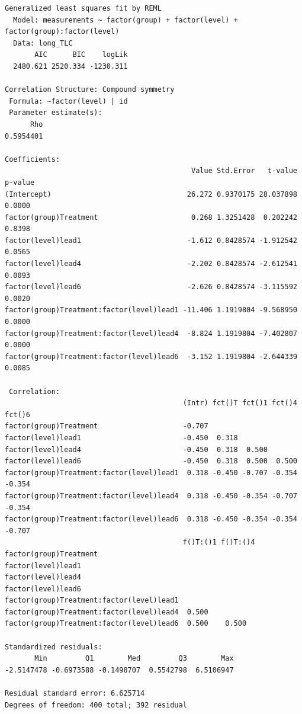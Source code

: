 \documentclass[
  letterpaper,
  DIV=11,
  numbers=noendperiod]{scrreprt}
\begin{document}
\begin{verbatim}
Generalized least squares fit by REML
  Model: measurements ~ factor(group) + factor(level) + factor(group):factor(level) 
  Data: long_TLC 
       AIC      BIC    logLik
  2480.621 2520.334 -1230.311

Correlation Structure: Compound symmetry
 Formula: ~factor(level) | id 
 Parameter estimate(s):
      Rho 
0.5954401 

Coefficients:
                                            Value Std.Error   t-value p-value
(Intercept)                                26.272 0.9370175 28.037898  0.0000
factor(group)Treatment                      0.268 1.3251428  0.202242  0.8398
factor(level)lead1                         -1.612 0.8428574 -1.912542  0.0565
factor(level)lead4                         -2.202 0.8428574 -2.612541  0.0093
factor(level)lead6                         -2.626 0.8428574 -3.115592  0.0020
factor(group)Treatment:factor(level)lead1 -11.406 1.1919804 -9.568950  0.0000
factor(group)Treatment:factor(level)lead4  -8.824 1.1919804 -7.402807  0.0000
factor(group)Treatment:factor(level)lead6  -3.152 1.1919804 -2.644339  0.0085

 Correlation: 
                                          (Intr) fct()T fct()1 fct()4 fct()6
factor(group)Treatment                    -0.707                            
factor(level)lead1                        -0.450  0.318                     
factor(level)lead4                        -0.450  0.318  0.500              
factor(level)lead6                        -0.450  0.318  0.500  0.500       
factor(group)Treatment:factor(level)lead1  0.318 -0.450 -0.707 -0.354 -0.354
factor(group)Treatment:factor(level)lead4  0.318 -0.450 -0.354 -0.707 -0.354
factor(group)Treatment:factor(level)lead6  0.318 -0.450 -0.354 -0.354 -0.707
                                          f()T:()1 f()T:()4
factor(group)Treatment                                     
factor(level)lead1                                         
factor(level)lead4                                         
factor(level)lead6                                         
factor(group)Treatment:factor(level)lead1                  
factor(group)Treatment:factor(level)lead4  0.500           
factor(group)Treatment:factor(level)lead6  0.500    0.500  

Standardized residuals:
       Min         Q1        Med         Q3        Max 
-2.5147478 -0.6973588 -0.1498707  0.5542798  6.5106947 

Residual standard error: 6.625714 
Degrees of freedom: 400 total; 392 residual
\end{verbatim}
\end{document}
